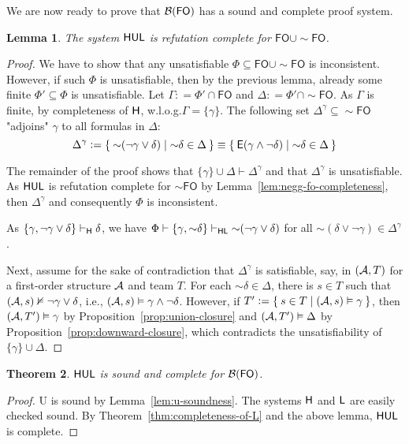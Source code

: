 \documentclass[a4paper,english,fleqn,11pt,final]{scrartcl}
\makeatletter
\newcommand{\ie}{i.e.\@\xspace}
\newcommand{\wloss}{w.l.o.g.\@\xspace}
\newcommand{\logicOpFont}[1]{\mathsf{#1}}
\newcommand{\negg}{{\sim}}
\newcommand{\logic}[1]{\ensuremath{\mathsf{#1}}\xspace}
\newcommand{\FO}{\logic{FO}}
\newcommand{\E}{\protect\ensuremath\logicOpFont{E}}
\newcommand{\calA}{\protect\ensuremath{\mathcal{A}}}
\newcommand{\calB}{\protect\ensuremath{\mathcal{B}}}
\newcommand{\sfH}{\protect\ensuremath{\mathsf{H}}}
\newcommand{\sfL}{\protect\ensuremath{\mathsf{L}}}
\newcommand{\sfU}{\protect\ensuremath{\mathsf{U}}}
\providecommand{\dfn}{\mathrel{\mathop:}=}
\newcommand{\Deriv}[1]{{\normalfont\textsf{#1}}}
\theoremstyle{plain}
\newtheorem{theorem}{Theorem}[section]
\newtheorem{lemma}[theorem]{Lemma}
\theoremstyle{definition}
\makeatother
\begin{document}
We are now ready to prove that $\calB(\FO)$ has a sound and complete proof system.

\begin{lemma}
	The system $\sfH\sfU\sfL$ is refutation complete for $\FO \cup \negg \FO$.
\end{lemma}
\begin{proof}
We have to show that any unsatisfiable $\Phi \subseteq \FO \cup \negg \FO$ is inconsistent.
However, if such $\Phi$ is unsatisfiable, then by the previous lemma, already some finite $\Phi' \subseteq \Phi$ is unsatisfiable.
Let $\Gamma \dfn \Phi' \cap \FO$ and $\Delta \dfn \Phi' \cap \negg \FO$.
As $\Gamma$ is finite, by completeness of $\sfH$, \wloss $\Gamma = \{\gamma\}$.
The following set $\Delta^\gamma \subseteq \negg \FO$ "adjoins" $\gamma$ to all formulas in $\Delta$:
\[
\Delta^\gamma \dfn \Set{ \negg(\neg \gamma \lor \delta) | \negg\delta \in \Delta} \equiv \Set{ \E(\gamma \land \neg \delta) | \negg \delta \in \Delta }
\]

The remainder of the proof shows that $\{\gamma\}\cup\Delta \vdash \Delta^\gamma$ and that $\Delta^\gamma$ is unsatisfiable.
As $\sfH\sfU\sfL$ is refutation complete for $\negg \FO$ by Lemma~\ref{lem:negg-fo-completeness}, then $\Delta^\gamma$ and consequently $\Phi$ is inconsistent.

As $\{\gamma,\neg\gamma \lor \delta\} \vdash_\sfH \delta$, we have $\Phi \vdash \{\gamma, \negg \delta\} \vdash_{\sfH\sfL} \negg(\neg\gamma\lor\delta)$ for all $\negg(\delta\lor\neg\gamma) \in \Delta^\gamma$.

 Next, assume for the sake of contradiction that $\Delta^\gamma$ is satisfiable, say, in $(\calA, T)$ for a first-order structure $\calA$ and team $T$.
For each $\negg\delta\in\Delta$, there is $s \in T$ such that $(\calA,s) \nvDash \neg\gamma \lor\delta $, \ie, $(\calA, s)\vDash \gamma\land \neg\delta $.
However, if $T' \dfn \Set{ s \in T | (\calA,s) \vDash \gamma }$, then $(\calA,T') \vDash \gamma$ by Proposition~\ref{prop:union-closure} and $(\calA,T')\vDash \Delta$ by Proposition~\ref{prop:downward-closure}, which contradicts the unsatisfiability of $\{\gamma\} \cup \Delta$.
\end{proof}

\begin{theorem}\label{thm:completeness-b-fo}
$\sfH\sfU\sfL$ is sound and complete for $\calB(\FO)$.
\end{theorem}
\begin{proof}
\Deriv{U} is sound by Lemma~\ref{lem:u-soundness}.
The systems $\sfH$ and $\sfL$ are easily checked sound.
By Theorem~\ref{thm:completeness-of-L} and the above lemma, $\sfH\sfU\sfL$ is complete.
\end{proof}
 
\end{document}
